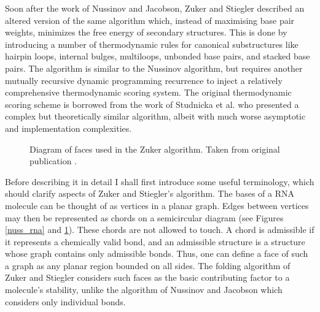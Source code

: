 \documentclass{cshonours}
\begin{document}
Soon after the work of Nussinov and Jacobson, Zuker and Stiegler \cite{zuker1981optimal}
described an altered version of the same algorithm which, instead of maximising
base pair weights, minimizes the free energy of secondary structures. This is done
by introducing a number of thermodynamic rules for canonical substructures like
hairpin loops, internal bulges, multiloops, unbonded base pairs, and stacked base
pairs. The algorithm is similar to the Nussinov algorithm, but requires another mutually recursive dynamic programming recurrence to inject
a relatively comprehensive thermodynamic scoring system. The original thermodynamic scoring scheme is borrowed from the work of Studnicka et al. \cite{studnicka1978computer} who presented a
complex but theoretically similar algorithm, albeit with
much worse asymptotic and implementation complexities. 


\begin{figure}
\begin{center}
\end{center}
\caption{Diagram of faces used in the Zuker algorithm. Taken from original
publication \cite{zuker1981optimal}.}
\label{zuk_struct}
\end{figure}

Before describing it in detail I shall first introduce some useful terminology, which should clarify aspects of Zuker and Stiegler’s
algorithm. The bases of a RNA molecule can be thought of as vertices in a planar graph. Edges between vertices may then be represented as chords on a semicircular diagram (see Figures \ref{nuss_rna} and \ref{zuk_struct}). These chords are not allowed to touch. A chord
is admissible if it represents a chemically valid bond, and an
admissible structure is a structure whose graph contains only admissible bonds.
Thus, one can define a face of such a graph as any planar region bounded on all
sides. The
folding algorithm of Zuker and Stiegler considers such faces as the basic contributing factor to a molecule's stability, unlike the algorithm of Nussinov and Jacobson
which considers only individual bonds.
\end{document}

